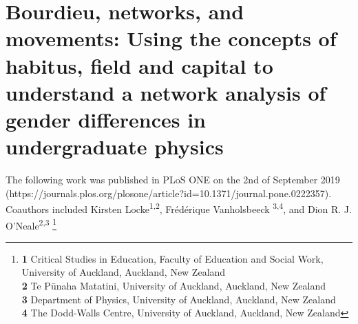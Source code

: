 \chapter[Bourdieu, Networks, and Movements][]{Bourdieu, networks, and movements: Using the concepts of habitus, field and capital to understand a network analysis of gender differences in undergraduate physics}

The following work was published in PLoS ONE on the 2nd of September 2019 (https://journals.plos.org/plosone/article?id=10.1371/journal.pone.0222357). Coauthors included Kirsten Locke\textsuperscript{1,2}, Fr\'ed\'erique Vanholsbeeck \textsuperscript{3,4}, and 
Dion R. J. O'Neale\textsuperscript{2,3}
\footnote{\textbf{1} Critical Studies in Education, Faculty of Education and Social Work, University of Auckland, Auckland, New Zealand
\\
\textbf{2} Te P\={u}naha Matatini, University of Auckland, Auckland, New Zealand
\\
\textbf{3} Department of Physics, University of Auckland, Auckland, New Zealand
\\
\textbf{4} The Dodd-Walls Centre, University of Auckland, Auckland, New Zealand}


